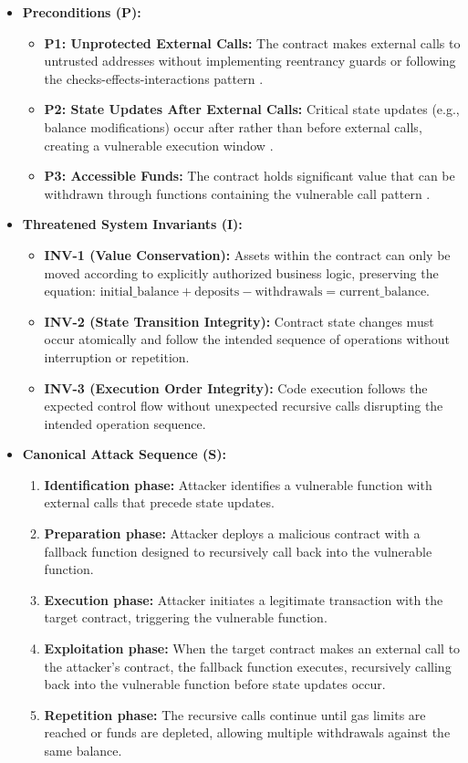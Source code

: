 \begin{itemize}
\item \textbf{Preconditions (P):}
    \begin{itemize}
    \item \textbf{P1: Unprotected External Calls:} The contract makes external calls to untrusted addresses without implementing reentrancy guards or following the checks-effects-interactions pattern \cite{perez2021analysis}.
    \item \textbf{P2: State Updates After External Calls:} Critical state updates (e.g., balance modifications) occur after rather than before external calls, creating a vulnerable execution window \cite{praitheeshan2019systematic}.
    \item \textbf{P3: Accessible Funds:} The contract holds significant value that can be withdrawn through functions containing the vulnerable call pattern \cite{zhou2023sok}.
    \end{itemize}

\item \textbf{Threatened System Invariants (I):}
    \begin{itemize}
    \item \textbf{INV-1 (Value Conservation):} Assets within the contract can only be moved according to explicitly authorized business logic, preserving the equation: $\text{initial\_balance} + \text{deposits} - \text{withdrawals} = \text{current\_balance}$.
    \item \textbf{INV-2 (State Transition Integrity):} Contract state changes must occur atomically and follow the intended sequence of operations without interruption or repetition.
    \item \textbf{INV-3 (Execution Order Integrity):} Code execution follows the expected control flow without unexpected recursive calls disrupting the intended operation sequence.
    \end{itemize}

\item \textbf{Canonical Attack Sequence (S):}
    \begin{enumerate}
    \item \textbf{Identification phase:} Attacker identifies a vulnerable function with external calls that precede state updates.
    \item \textbf{Preparation phase:} Attacker deploys a malicious contract with a fallback function designed to recursively call back into the vulnerable function.
    \item \textbf{Execution phase:} Attacker initiates a legitimate transaction with the target contract, triggering the vulnerable function.
    \item \textbf{Exploitation phase:} When the target contract makes an external call to the attacker's contract, the fallback function executes, recursively calling back into the vulnerable function before state updates occur.
    \item \textbf{Repetition phase:} The recursive calls continue until gas limits are reached or funds are depleted, allowing multiple withdrawals against the same balance.
    \end{enumerate}
\end{itemize}

